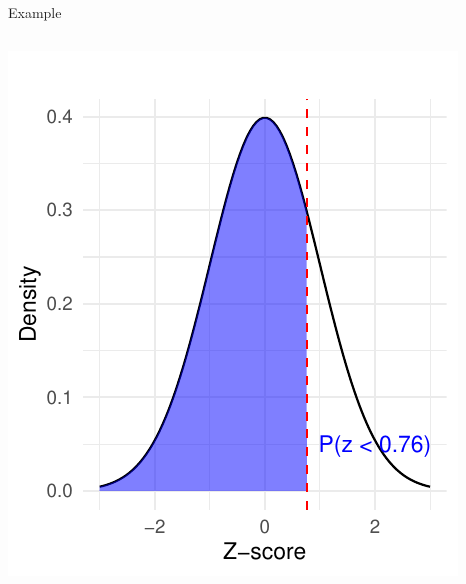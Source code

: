 \documentclass[
  ignorenonframetext,
]{beamer}
\begin{document}
\begin{frame}[fragile]{Example}
\begin{columns}[T]
\begin{column}{0.5\textwidth}
\includegraphics{M5-Hypothesis-Testing,-Probability-and-Distribution_files/figure-beamer/unnamed-chunk-18-1.pdf}
\end{column}
\end{columns}
\end{frame}
\end{document}
